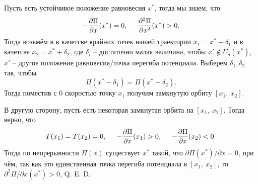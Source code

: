 Пусть есть устойчивое положение равновесия $x^*$, тогда мы знаем, что
\begin{equation*}
    -\frac{\partial \Pi}{\partial x} (x^*) = 0, \hspace{0.5cm} \frac{\partial^2 \Pi}{\partial x^2} (x^*) > 0.
\end{equation*}
Тогда возьмём в в качетсве крайних точек нашей траектории $x_1 = x^* - \delta_1$ и в качетсве $x_2 = x^* + \delta_2$, где $\delta_i$ -- достаточно малая величина, чтобы $x' \notin U_\delta (x^*)$, $x' $ -- другое положение равновесия/точка перегиба потенциала. Выберем $\delta_1, \delta_2$ так, чтобы
\begin{equation*}
    \Pi(x^* - \delta_1) = \Pi(x^* + \delta_2).
\end{equation*}
Тогда поместив с 0 скоростью точку $x_1$ получим замкнутую орбиту $[x_1, \ x_2]$.

В другую сторону, пусть есть некоторая замкнутая орбита на $[x_1, \ x_2]$. Тогда верно, что
\begin{equation*}
    T(x_1) = T(x_2) = 0, \hspace{0.5cm} 
    -\frac{\partial \Pi}{\partial x} (x_1) > 0, \hspace{0.5cm} 
    -\frac{\partial \Pi}{\partial x} (x_2) < 0.
\end{equation*}
Тогда по непрерывности $\Pi(x)$ существует $x^*$ такой, что $\partial \Pi(x^*) / \partial x = 0$, при чём, так как это единственная точка перегиба потенциала в $[x_1, \ x_2]$, то $\partial^2 \Pi / \partial x (x^*) > 0$, Q. E. D.